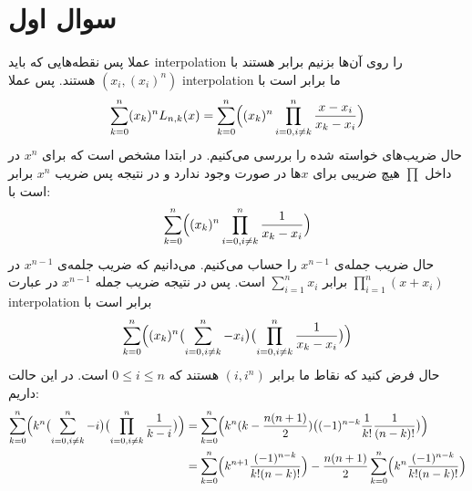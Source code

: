 \documentclass[]{article}
\begin{document}
\printheader

\section*{سوال اول}
عملا پس نقطه‌هایی که باید
interpolation
را روی آن‌ها بزنیم برابر هستند با
$\left(x_i, \left(x_i\right)^n\right)$
هستند. پس عملا
interpolation
ما برابر است با
\begin{gather*}
    \sum_{k=0}^{n} (x_k)^n L_{n, k} (x) = \sum_{k=0}^{n} \Bigl((x_k)^n \prod_{i=0, i \neq k}^{n} \frac{x - x_i}{x_k - x_i}\Bigr)
\end{gather*}
حال ضریب‌های خواسته شده را بررسی می‌کنیم. در ابتدا مشخص است که برای
$x^n$
در داخل
$\prod$
هیچ ضریبی برای
$x$ها
در صورت وجود ندارد و در نتیجه پس ضریب
$x^n$
برابر است با:
\begin{gather*}
    \sum_{k=0}^{n} \Bigl( (x_k)^n \prod_{i=0, i \neq k}^{n} \frac{1}{x_k - x_i} \Bigr)
\end{gather*}
حال ضریب جمله‌ی
$x^{n-1}$
را حساب می‌کنیم. می‌دانیم که ضریب جلمه‌ی
$x^{n-1}$
در
$\prod_{i=1}^n (x + x_i)$
برابر
$\sum_{i=1}^n x_i$
است. پس در نتیجه ضریب جمله
$x^{n-1}$
در عبارت
interpolation
برابر است با
\begin{gather*}
    \sum_{k=0}^{n} \Bigl((x_k)^n \bigl( \sum_{i=0, i \neq k}^{n} -x_i  \bigr) \bigl( \prod_{i=0, i \neq k}^{n} \frac{1}{x_k - x_i} \bigr) \Bigr)
\end{gather*}
حال فرض کنید که نقاط ما برابر
$(i, i^n)$
هستند که
$0 \le i \le n$
است. در این حالت داریم:
\begin{align*}
    \sum_{k=0}^{n} \Bigl(k^n \bigl( \sum_{i=0, i \neq k}^{n} -i  \bigr) \bigl(\prod_{i=0, i \neq k}^{n} \frac{1}{k - i} \bigr) \Bigr)
    &= \sum_{k=0}^{n} \Bigl(k^n (k - \frac{n(n+1)}{2}) \bigl((-1)^{n-k} \frac{1}{k!} \frac{1}{(n - k)!} \bigr) \Bigr)\\
    &= \sum_{k=0}^{n} \Bigl(k^{n+1} \frac{(-1)^{n-k}}{k!(n - k)!} \Bigr) - \frac{n(n+1)}{2} \sum_{k=0}^{n} \Bigl(k^n \frac{(-1)^{n-k}}{k!(n - k)!}\Bigr)
\end{align*}
\end{document}
